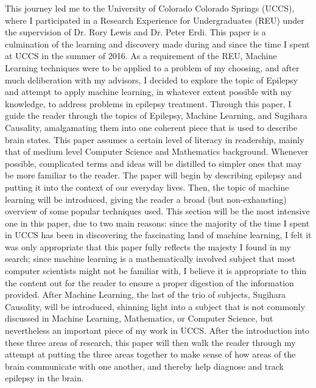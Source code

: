 This journey led me to the University of Colorado Colorado Springs (UCCS), where I participated in a Research Experience for Undergraduates (REU) under the supervision of Dr. Rory Lewis and Dr. Peter Erdi. This paper is a culmination of the learning and discovery made during and since the time I spent at UCCS in the summer of 2016. As a requirement of the REU, Machine Learning techniques were to be applied to a problem of my choosing, and after much deliberation with my advisors, I decided to explore the topic of Epilepsy and attempt to apply machine learning, in whatever extent possible with my knowledge, to address problems in epilepsy treatment. Through this paper, I guide the reader through the topics of Epilepsy, Machine Learning, and Sugihara Causality, amalgamating them into one coherent piece that is used to describe brain states. This paper assumes a certain level of literacy in readership, mainly that of medium level Computer Science and Mathematics background. Whenever possible, complicated terms and ideas will be distilled to simpler ones that may be more familiar to the reader. The paper will begin by describing epilepsy and putting it into the context of our everyday lives. Then, the topic of machine learning will be introduced, giving the reader a broad (but non-exhausting) overview of some popular techniques used. This section will be the most intensive one in this paper, due to two main reasons: since the majority of the time I spent in UCCS has been in discovering the fascinating land of machine learning, I felt it was only appropriate that this paper fully reflects the majesty I found in my search; since machine learning is a mathematically involved subject that most computer scientists might not be familiar with, I believe it is appropriate to thin the content out for the reader to ensure a proper digestion of the information provided. After Machine Learning, the last of the trio of subjects, Sugihara Causality, will be introduced, shinning light into a subject that is not commonly discussed in Machine Learning, Mathematics, or Computer Science, but nevertheless an important piece of my work in UCCS. After the introduction into these three areas of research, this paper will then walk the reader through my attempt at putting the three areas together to make sense of how areas of the brain communicate with one another, and thereby help diagnose and track epilepsy in the brain.



